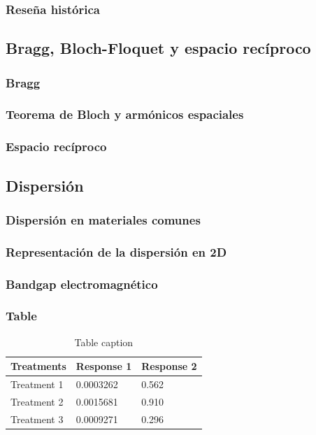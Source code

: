 \documentclass{beamer}
\begin{document}
	\begin{frame}
	\frametitle{Reseña histórica}
	\end{frame}
	
	\subsection{Bragg, Bloch-Floquet y espacio recíproco}
	
		\begin{frame}
		\frametitle{Bragg}
		\end{frame}
	
		\begin{frame}
		\frametitle{Teorema de Bloch y armónicos espaciales}
		\end{frame}
	
		\begin{frame}
		\frametitle{Espacio recíproco}
		\end{frame}
	
	\subsection{Dispersión}
	
		\begin{frame}
		\frametitle{Dispersión en materiales comunes}
		\end{frame}
	
		\begin{frame}
		\frametitle{Representación de la dispersión en 2D}
		\end{frame}
	
		\begin{frame}
		\frametitle{Bandgap electromagnético}
		\end{frame}

\begin{frame}
\frametitle{Table}
\begin{table}
\begin{tabular}{l l l}
\toprule
\textbf{Treatments} & \textbf{Response 1} & \textbf{Response 2}\\
\midrule
Treatment 1 & 0.0003262 & 0.562 \\
Treatment 2 & 0.0015681 & 0.910 \\
Treatment 3 & 0.0009271 & 0.296 \\
\bottomrule
\end{tabular}
\caption{Table caption}
\end{table}
\end{frame}
\end{document}
